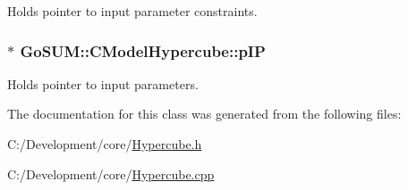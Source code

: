 Holds pointer to input parameter constraints. 

\hypertarget{class_go_s_u_m_1_1_c_model_hypercube_a7382643c37cf27c4b1e881bdf08b7ff4}{
\subsubsection[{p\-I\-P}]{$\ast$ Go\-S\-U\-M\-::\-C\-Model\-Hypercube\-::p\-I\-P\hspace{0.3cm}{\ttfamily [protected]}}}\label{class_go_s_u_m_1_1_c_model_hypercube_a7382643c37cf27c4b1e881bdf08b7ff4}


Holds pointer to input parameters. 



The documentation for this class was generated from the following files\-:\begin{DoxyCompactItemize}
\item 
C\-:/\-Development/core/\hyperlink{_hypercube_8h}{Hypercube.\-h}\item 
C\-:/\-Development/core/\hyperlink{_hypercube_8cpp}{Hypercube.\-cpp}\end{DoxyCompactItemize}
